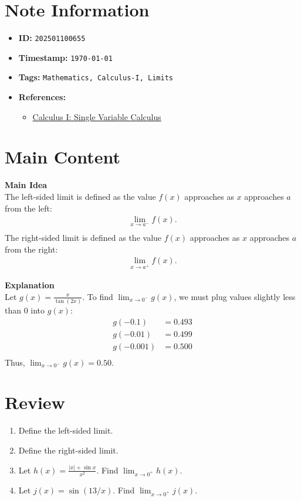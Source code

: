 \clearpage
{}
\label{202501100655}
\renewcommand{\notetitle}{One-sided Limits}

\section*{Note Information}
\begin{itemize}
  \item \textbf{ID:} \texttt{202501100655}
  \item \textbf{Timestamp:} \texttt{\today \ \currenttime}
  \item \textbf{Tags:} \texttt{Mathematics, Calculus-I, Limits}
  \item \textbf{References:}
    \begin{itemize}
      \item \href{https://ocw.mit.edu/courses/18-01-calculus-i-single-variable-calculus-fall-2020/}{Calculus I: Single Variable Calculus}
    \end{itemize}
\end{itemize}


\section*{Main Content}
\textbf{Main Idea}\\
The left-sided limit is defined as the value $f(x)$ approaches as $x$ approaches $a$ from the left: 
\begin{align*}
  \lim_{x \rightarrow a^-} f(x).\\    
\end{align*}
The right-sided limit is defined as the value $f(x)$ approaches as $x$ approaches $a$ from the right:
\begin{align*}
  \lim_{x \rightarrow a^+} f(x).
\end{align*}

\textbf{Explanation}\\
Let $g(x) = \frac{x}{\tan(2x)}$. To find $\lim_{x \rightarrow 0^-} g(x)$, we must plug values slightly less than 0 into $g(x)$:
\begin{align*}
  g(-0.1) &= 0.493\\
  g(-0.01) &= 0.499\\
  g(-0.001) &= 0.500\\
\end{align*}
Thus, $\lim_{x \rightarrow 0^-} g(x) = 0.50$.

\section*{Review}
\begin{enumerate}
  \item Define the left-sided limit.
  \item Define the right-sided limit.
  \item Let $h(x) = \frac{|x| + \sin x}{x^2}$. Find $\lim_{x \rightarrow 0^+} h(x)$.
  \item Let $j(x) = \sin(13/x)$. Find $\lim_{x \rightarrow 0^+} j(x)$. 
\end{enumerate}


